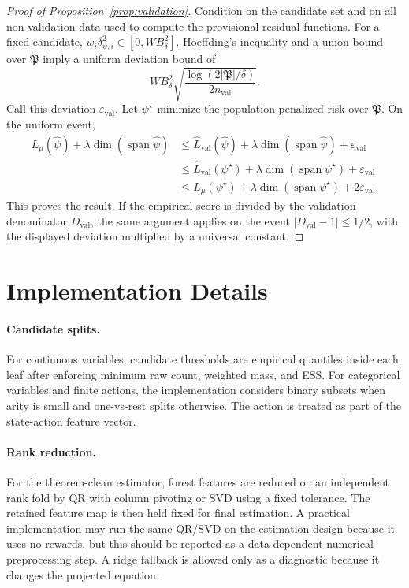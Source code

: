 \documentclass{article}
\DeclareMathOperator{\spann}{span}
\theoremstyle{plain}
\theoremstyle{definition}
\theoremstyle{remark}
\begin{document}
\begin{proof}[Proof of Proposition~\ref{prop:validation}]
Condition on the candidate set and on all non-validation data used to compute
the provisional residual functions. For a fixed candidate,
\(w_i\delta_{\psi,i}^2\in[0,WB_\delta^2]\).
Hoeffding's inequality and a union bound over \(\mathfrak P\) imply a uniform
deviation bound of
\[
  WB_\delta^2
  \sqrt{\frac{\log(2|\mathfrak P|/\delta)}{2n_{\mathrm{val}}}}.
\]
Call this deviation \(\varepsilon_{\mathrm{val}}\). Let
\(\psi^\star\) minimize the population penalized risk over \(\mathfrak P\).
On the uniform event,
\[
  \begin{aligned}
  L_\mu(\hat\psi)+\lambda\dim(\spann\hat\psi)
  &\le
  \widehat L_{\mathrm{val}}(\hat\psi)
  +\lambda\dim(\spann\hat\psi)
  +\varepsilon_{\mathrm{val}}\\
  &\le
  \widehat L_{\mathrm{val}}(\psi^\star)
  +\lambda\dim(\spann\psi^\star)
  +\varepsilon_{\mathrm{val}}\\
  &\le
  L_\mu(\psi^\star)
  +\lambda\dim(\spann\psi^\star)
  +2\varepsilon_{\mathrm{val}}.
  \end{aligned}
\]
This proves the result. If the empirical score is divided by the validation
denominator \(D_{\mathrm{val}}\), the same argument applies on the event
\(|D_{\mathrm{val}}-1|\le 1/2\), with the displayed deviation multiplied by a
universal constant.
\end{proof}

\section{Implementation Details}
\label{app:implementation}

\paragraph{Candidate splits.}
For continuous variables, candidate thresholds are empirical quantiles inside
each leaf after enforcing minimum raw count, weighted mass, and ESS. For
categorical variables and finite actions, the implementation considers binary
subsets when arity is small and one-vs-rest splits otherwise. The action is
treated as part of the state-action feature vector.

\paragraph{Rank reduction.}
For the theorem-clean estimator, forest features are reduced on an independent
rank fold by QR with column pivoting or SVD using a fixed tolerance. The
retained feature map is then held fixed for final estimation. A practical
implementation may run the same QR/SVD on the estimation design because it uses
no rewards, but this should be reported as a data-dependent numerical
preprocessing step. A ridge fallback is allowed only as a diagnostic because it
changes the projected equation.
\end{document}
